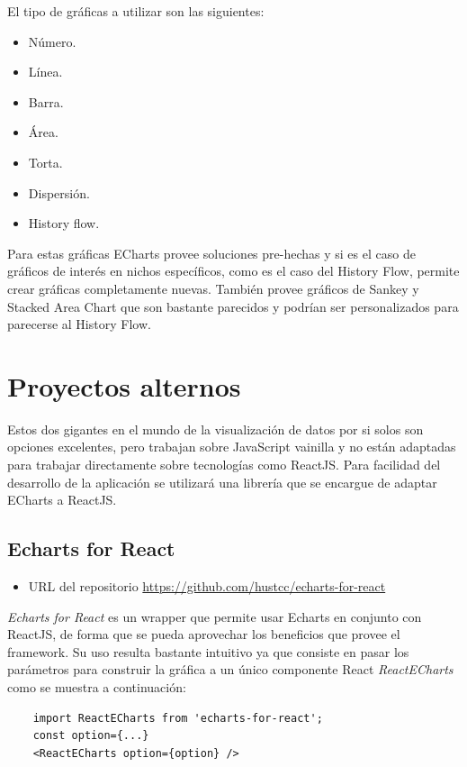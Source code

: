 El tipo de gráficas a utilizar son las siguientes:
\begin{itemize}    
    \item Número.
    \item Línea.
    \item Barra.
    \item Área.
    \item Torta.
    \item Dispersión.
    \item History flow.
\end{itemize}

Para estas gráficas ECharts provee soluciones pre-hechas y si es el caso de gráficos de interés en nichos específicos, como es el caso del History Flow, permite crear gráficas completamente nuevas.
También provee gráficos de Sankey y Stacked Area Chart que son bastante parecidos y podrían ser personalizados para parecerse al History Flow.

\section{ Proyectos alternos }
Estos dos gigantes en el mundo de la visualización de datos por si solos son opciones excelentes, pero trabajan sobre JavaScript vainilla y no están adaptadas para trabajar directamente sobre tecnologías como ReactJS. 
Para facilidad del desarrollo de la aplicación se utilizará una librería que se encargue de adaptar ECharts a ReactJS.

\subsection{ Echarts for React }
\begin{itemize}
    \item URL del repositorio \href{https://github.com/hustcc/echarts-for-react}{https://github.com/hustcc/echarts-for-react}
\end{itemize}

\emph{Echarts for React} es un wrapper que permite usar Echarts en conjunto con ReactJS, de forma que se pueda aprovechar los beneficios que provee el framework. Su uso resulta bastante intuitivo ya que consiste en pasar los parámetros para construir la gráfica a un único componente React \emph{ReactECharts} como se muestra a continuación:

\begin{lstlisting}
    import ReactECharts from 'echarts-for-react';
    const option={...}
    <ReactECharts option={option} /> 
\end{lstlisting}

